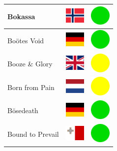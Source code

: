 \documentclass[12pt, a4paper, twoside]{report}
\begin{document}
\begin{center}
\begin{longtable}{|p{5cm}|p{2cm}|p{2cm}|}
Bokassa & \includegraphics[width=1cm]{4x3/no} & \includegraphics[width=1cm]{likes/y} \\ \hline
Boötes Void & \includegraphics[width=1cm]{4x3/de} & \includegraphics[width=1cm]{likes/y} \\ \hline
Booze \& Glory & \includegraphics[width=1cm]{4x3/gb} & \includegraphics[width=1cm]{likes/m} \\ \hline
Born from Pain & \includegraphics[width=1cm]{4x3/nl} & \includegraphics[width=1cm]{likes/m} \\ \hline
Bösedeath & \includegraphics[width=1cm]{4x3/de} & \includegraphics[width=1cm]{likes/y} \\ \hline
Bound to Prevail & \includegraphics[width=1cm]{4x3/mt} & \includegraphics[width=1cm]{likes/y} \\ \hline

\end{longtable}
\end{center}
\end{document}
